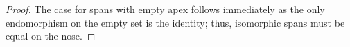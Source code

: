 \begin{proof}
The case for spans with empty apex follows immediately as the only endomorphism on the empty set is the identity; thus,  isomorphic spans must be equal on the nose.

\end{proof}

